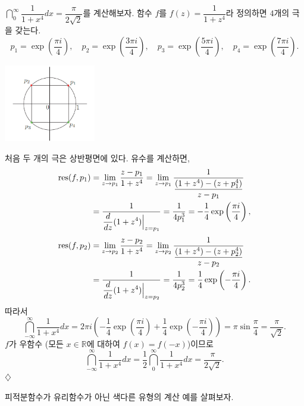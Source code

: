 \begin{saltexample}[label=example-4-19]{}{}
$\dint_0^ \infty \dfrac1{1+x^4}dx = \dfrac{\pi}{2\sqrt{2}}$를 계산해보자.
함수 $f$를  $f(z) = \dfrac1{1+z^4}$라 정의하면 $4$개의 극을 갖는다.
\[
p_1 = \exp\left(\dfrac{\pi i}4\right), \quad
p_2 = \exp\left(\dfrac{3\pi i}4\right), \quad
p_3 = \exp\left(\dfrac{5\pi i}4\right), \quad
p_4 = \exp\left(\dfrac{7\pi i}4\right).
\]
\begin{center}
\includegraphics[width=0.3\textwidth]{./SaltChapter/fig-4-0-12}
\end{center}
\end{saltexample}
처음 두 개의 극은 상반평면에 있다. 유수를 계산하면,
\begin{align*}
\mathop{\mathrm{res}}(f,p_1) &= \lim_{z\to p_1} \displaystyle\frac{z-p_1}{1+z^4} 
= \lim_{z\to p_1} \displaystyle\frac1{\displaystyle\frac{(1+z^4) - (z+p_1^4)}{z-p_1}} \\
&= \displaystyle\frac1{\displaystyle\frac{d}{dz}(1+z^4)\Big|_{z=p_1}} = \displaystyle\frac1{4p_1^3}
= - \displaystyle\frac14 \exp\left(\displaystyle\frac{\pi i}4\right),
\end{align*}
\begin{align*}
\mathop{\mathrm{res}}(f,p_2) &= \lim_{z\to p_2} \displaystyle\frac{z-p_2}{1+z^4} 
= \lim_{z\to p_2} \displaystyle\frac1{\displaystyle\frac{(1+z^4) - (z+p_2^4)}{z-p_2}} \\
&= \displaystyle\frac1{\displaystyle\frac{d}{dz}(1+z^4)\Big|_{z=p_2}} = \displaystyle\frac1{4p_2^3}
= \displaystyle\frac14 \exp\left(-\displaystyle\frac{\pi i}4\right).
\end{align*}
따라서
\[
\dint_{-\infty}^ \infty \dfrac1{1+x^4}dx
= 2\pi i \left( - \dfrac14 \exp\left(\dfrac{\pi i}4\right)
+ \dfrac14 \exp\left(-\dfrac{\pi i}4\right) \right)
= \pi \sin \dfrac\pi 4 = \dfrac\pi{\sqrt{2}}.
\]
$f$가 우함수 (모든 $x\in\mathbb R$에 대하여 $f(x)=f(-x)$)이므로
\[
\dint_{-\infty}^ \infty \dfrac1{1+x^4}dx = \dfrac12 
\dint_0^ \infty \dfrac1{1+x^4}dx = \dfrac{\pi}{2\sqrt{2}}.
\]
\hfill $\diamondsuit$

피적분함수가 유리함수가 아닌 색다른  유형의 계산 예를 살펴보자.

